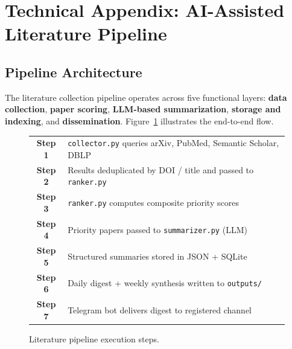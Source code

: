 
\section*{Technical Appendix: AI-Assisted Literature Pipeline}
\label{sec:technical_appendix}


\subsection{Pipeline Architecture}
\label{sec:app_pipeline}

The literature collection pipeline operates across five functional layers:
\textbf{data collection}, \textbf{paper scoring}, \textbf{LLM-based
summarization}, \textbf{storage and indexing}, and \textbf{dissemination}.
Figure~\ref{fig:pipeline_overview} illustrates the end-to-end flow.

\begin{figure}[htbp]
\centering
\begin{tabular}{cl}
\textbf{Step 1} & \texttt{collector.py} queries arXiv, PubMed, Semantic Scholar, DBLP \\
\textbf{Step 2} & Results deduplicated by DOI / title and passed to \texttt{ranker.py} \\
\textbf{Step 3} & \texttt{ranker.py} computes composite priority scores \\
\textbf{Step 4} & Priority papers passed to \texttt{summarizer.py} (LLM) \\
\textbf{Step 5} & Structured summaries stored in JSON + SQLite \\
\textbf{Step 6} & Daily digest + weekly synthesis written to \texttt{outputs/} \\
\textbf{Step 7} & Telegram bot delivers digest to registered channel \\
\end{tabular}
\caption{Literature pipeline execution steps.}
\label{fig:pipeline_overview}
\end{figure}

